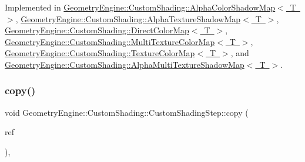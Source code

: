 Implemented in \mbox{\hyperlink{class_geometry_engine_1_1_custom_shading_1_1_alpha_color_shadow_map_a9c9a47e7868b8ef033626de0994a1733}{Geometry\+Engine\+::\+Custom\+Shading\+::\+Alpha\+Color\+Shadow\+Map$<$ T $>$}}, \mbox{\hyperlink{class_geometry_engine_1_1_custom_shading_1_1_alpha_texture_shadow_map_a5ff646b3f8b6da56acd2d98f09265769}{Geometry\+Engine\+::\+Custom\+Shading\+::\+Alpha\+Texture\+Shadow\+Map$<$ T $>$}}, \mbox{\hyperlink{class_geometry_engine_1_1_custom_shading_1_1_direct_color_map_aef31a0e4c639e006292dde48e9d2c710}{Geometry\+Engine\+::\+Custom\+Shading\+::\+Direct\+Color\+Map$<$ T $>$}}, \mbox{\hyperlink{class_geometry_engine_1_1_custom_shading_1_1_multi_texture_color_map_a74c244479b1a529cf311fea441c44159}{Geometry\+Engine\+::\+Custom\+Shading\+::\+Multi\+Texture\+Color\+Map$<$ T $>$}}, \mbox{\hyperlink{class_geometry_engine_1_1_custom_shading_1_1_texture_color_map_a6ad5122de9e2e82000a69b9a777845b1}{Geometry\+Engine\+::\+Custom\+Shading\+::\+Texture\+Color\+Map$<$ T $>$}}, and \mbox{\hyperlink{class_geometry_engine_1_1_custom_shading_1_1_alpha_multi_texture_shadow_map_a7a62881619d6247fee10fb74d4fc79e2}{Geometry\+Engine\+::\+Custom\+Shading\+::\+Alpha\+Multi\+Texture\+Shadow\+Map$<$ T $>$}}.

\mbox{\label{class_geometry_engine_1_1_custom_shading_1_1_custom_shading_step_aa19da7a0827568a1f4741ba4f944cbdd}} 
\subsubsection{\texorpdfstring{copy()}{copy()}}
{\footnotesize\ttfamily void Geometry\+Engine\+::\+Custom\+Shading\+::\+Custom\+Shading\+Step\+::copy (\begin{DoxyParamCaption}\item[{const \mbox{\hyperlink{class_geometry_engine_1_1_custom_shading_1_1_custom_shading_step}{Custom\+Shading\+Step}} \&}]{ref }\end{DoxyParamCaption})\hspace{0.3cm}{\ttfamily [protected]}, {\ttfamily [virtual]}}

